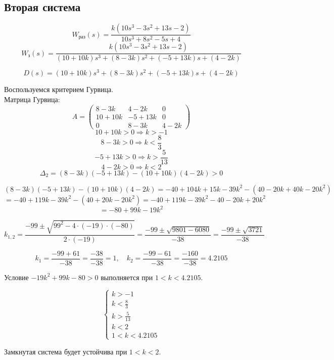 \subsection{Вторая система}
$$W_\text{раз}(s)=\frac{k(10s^3-3s^2+13s-2)}{10s^3+8s^2-5s+4}$$
$$W_\text{з}(s)=\frac{k(10s^3-3s^2+13s-2)}{(10+10k)s^3+(8-3k)s^2+(-5+13k)s+(4-2k)}$$

$$D(s)=(10+10k)s^3+(8-3k)s^2+(-5+13k)s+(4-2k)$$

Воспользуемся критерием Гурвица.\\

Матрица Гурвица:
$$A= \begin{pmatrix}
8-3k & 4-2k & 0 \\
10+10k & -5+13k & 0 \\
0 & 8-3k & 4-2k
\end{pmatrix}$$
$$
10+10k>0 \Rightarrow k>-1
$$$$
8-3k>0 \Rightarrow k<\frac{8}{3}
$$$$
-5+13k>0 \Rightarrow k>\frac{5}{13}
$$$$
4-2k>0 \Rightarrow k<2
$$$$
\Delta_2 = (8-3k)(-5+13k) - (10+10k)(4-2k)>0
$$

$$(8-3k)(-5+13k) - (10+10k)(4-2k) = -40+104k+15k-39k^2 - (40-20k+40k-20k^2)$$
$$= -40+119k-39k^2 - (40+20k-20k^2) = -40+119k-39k^2 -40-20k+20k^2$$
$$=-80+99k-19k^2$$

$$k_{1,2}=\frac{-99\pm\sqrt{99^2-4\cdot(-19)\cdot(-80)}}{2\cdot(-19)}=\frac{-99\pm\sqrt{9801-6080}}{-38}=\frac{-99\pm\sqrt{3721}}{-38}$$

$$k_1=\frac{-99+61}{-38}=\frac{-38}{-38}=1,\quad k_2=\frac{-99-61}{-38}=\frac{-160}{-38}=4.2105$$

Условие $-19k^2+99k-80>0$ выполняется при $1<k<4.2105$.

$$
\begin{cases}
k>-1\\
k<\frac{8}{3}\\
k>\frac{5}{13}\\
k<2\\
1<k<4.2105
\end{cases}
$$

Замкнутая система будет устойчива при $1<k<2$.


